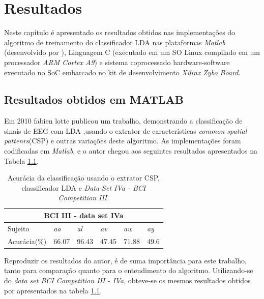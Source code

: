 \chapter[Resultados e Dicussão ]{Resultados}

Neste capítulo é apresentado os resultados obtidos nas implementações do algoritmo de treinamento do classificador LDA nas plataformas \textit{Matlab} (desenvolvido por \cite{F.Lotte}), Linguagem C (executado em um SO Linux compilado em um processador \textit{ARM Cortex A9}) e sistema coprocessado hardware-software executado no SoC embarcado no kit de desenvolvimento \textit{Xilinx Zybo Board}.

\section{Resultados obtidos em MATLAB}
Em 2010 fabien lotte publicou um trabalho, demonstrando a classificação de sinais de EEG com LDA \cite{F.Lotte},usando o extrator de características \textit{common spatial pattenrs}(CSP) e outras
variações deste algoritmo. 
As implementações foram codificadas em \textit{Matlab}, e o autor chegou aos seguintes resultados apresentados na Tabela \ref{resultlotte}.

\begin{table}[h]
\centering
\caption{Acurácia da classificação usando o extrator CSP, classificador LDA e  \textit{Data-Set IVa - BCI Competition III}.}
\label{resultlotte}
\begin{tabular}{|l|l|l|l|l|l|}
\hline
\multicolumn{6}{|c|}{BCI III -  data set IVa}  \\ \hline
Sujeito & \textit{aa}    & \textit{al}    & \textit{av}    & \textit{aw}    & \textit{ay}   \\ \hline
Acurácia(\%)     & 66.07 & 96.43 & 47.45 & 71.88 & 49.6 \\ \hline
\end{tabular}
\end{table}
 
Reproduzir os resultados do autor, é de suma importância para este trabalho, tanto para comparação quanto para o entendimento do algoritmo. Utilizando-se do \textit{data set BCI Competition III - IVa}, obteve-se os mesmos resultados obtidos por \cite{F.Lotte} apresentados na tabela \ref{resultlotte}.

